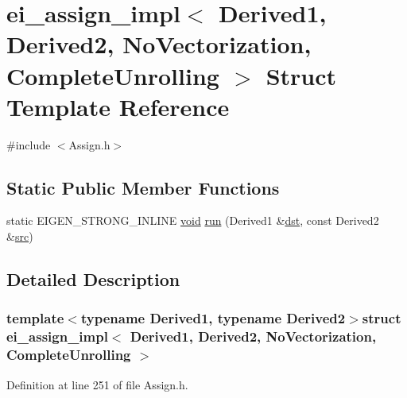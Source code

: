 \hypertarget{structei__assign__impl_3_01_derived1_00_01_derived2_00_01_no_vectorization_00_01_complete_unrolling_01_4}{\section{ei\-\_\-assign\-\_\-impl$<$ Derived1, Derived2, No\-Vectorization, Complete\-Unrolling $>$ Struct Template Reference}
\label{structei__assign__impl_3_01_derived1_00_01_derived2_00_01_no_vectorization_00_01_complete_unrolling_01_4}
}


{\ttfamily \#include $<$Assign.\-h$>$}

\subsection*{Static Public Member Functions}
\begin{DoxyCompactItemize}
\item 
static E\-I\-G\-E\-N\-\_\-\-S\-T\-R\-O\-N\-G\-\_\-\-I\-N\-L\-I\-N\-E \hyperlink{group___u_a_v_objects_plugin_ga444cf2ff3f0ecbe028adce838d373f5c}{void} \hyperlink{structei__assign__impl_3_01_derived1_00_01_derived2_00_01_no_vectorization_00_01_complete_unrolling_01_4_a7102ffb4ef60150c938f0d29fe0ac500}{run} (Derived1 \&\hyperlink{glext_8h_a92034251bfd455d524a9b5610cddba00}{dst}, const Derived2 \&\hyperlink{glext_8h_a72e0fdf0f845ded60b1fada9e9195cd7}{src})
\end{DoxyCompactItemize}


\subsection{Detailed Description}
\subsubsection*{template$<$typename Derived1, typename Derived2$>$struct ei\-\_\-assign\-\_\-impl$<$ Derived1, Derived2, No\-Vectorization, Complete\-Unrolling $>$}



Definition at line 251 of file Assign.\-h.



